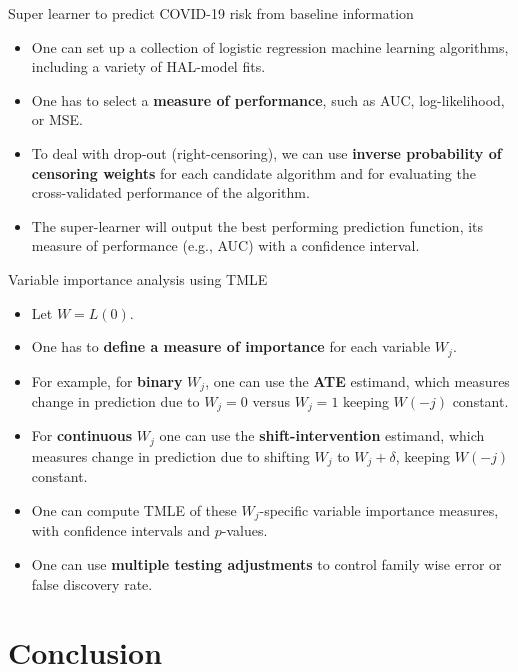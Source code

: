 \documentclass[t]{beamer}
\begin{document}
\begin{frame}{Super learner to predict COVID-19 risk from baseline information}
\begin{itemize}
\item One can set up a collection of logistic regression machine learning algorithms, including a variety of HAL-model fits.
\item One has to select a {\bf measure of performance}, such as AUC, log-likelihood, or MSE.
\item To deal with drop-out (right-censoring), we can use {\bf inverse probability of censoring weights} for each candidate algorithm and for evaluating the cross-validated performance of the algorithm.
\item The super-learner will output the best performing prediction function, its measure of performance (e.g., AUC) with a confidence interval.
\end{itemize}
\end{frame}

\begin{frame}{Variable importance analysis using TMLE}
\begin{itemize}
\item Let $W=L(0)$.
\item One has to {\bf define a measure of importance} for each variable $W_j$.
\item For example, for {\bf binary} $W_j$, one can use the {\bf ATE} estimand, which measures change in prediction due to $W_j=0$ versus $W_j=1$ keeping $W(-j)$ constant.
\item For {\bf continuous} $W_j$ one can use the {\bf shift-intervention} estimand, which measures change in prediction due to shifting  $W_j$ to $W_j+\delta$, keeping $W(-j)$ constant.
\item One can compute TMLE of these $W_j$-specific variable importance measures, with confidence intervals and $p$-values.
\item One can use {\bf multiple testing adjustments} to control family wise error or false discovery rate.
\end{itemize}
\end{frame}

\section{Conclusion}
\end{document}
